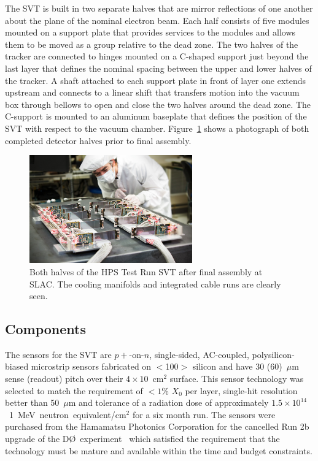 \documentclass[final,3p,times,twocolumn]{elsarticle}
\newcommand{\fluenceunit}{1~MeV~neutron~equivalent/cm\ensuremath{^2}}
\begin{document}
The SVT is built in two separate halves that are mirror reflections of one another about the plane of 
the nominal electron beam.  Each half consists of five modules mounted on a support plate that 
provides services to the modules and allows them to be moved as a group relative to the dead zone. 
The two halves of the tracker are connected to hinges mounted on a C-shaped support just beyond 
the last layer that defines the nominal spacing between the upper and lower halves of the tracker.  A 
shaft attached to each support plate in front of layer one extends upstream and connects to a linear shift 
that transfers motion into the vacuum box through bellows to open and close the two halves around 
the dead zone. The C-support is mounted to an aluminum baseplate that defines the position of the 
SVT with respect to the vacuum chamber. Figure~\ref{fig:tracker_halves} shows a photograph of both 
completed detector halves prior to final assembly. 
\begin{figure}[htp]
\begin{center}
    \includegraphics[width=7cm]{figures/2012-101-PHOTON-DETECTOR-001}
\caption{\small{Both halves of the HPS Test Run SVT after final assembly at SLAC.  The cooling manifolds and 
integrated cable runs are clearly seen.} }
\label{fig:tracker_halves}
\end{center}
\end{figure}

\subsection{Components}
The sensors for the SVT are $p+$-on-$n$, single-sided, AC-coupled, polysilicon-biased microstrip 
sensors fabricated on $<$100$>$ silicon and have 30 (60)~$\mu$m sense (readout) pitch over their 
$4\times10$~cm$^2$ surface. This sensor technology was selected to match the requirement of 
$<1$\% $X_0$ per layer, single-hit resolution better than 50~$\mu$m and tolerance of a radiation 
dose of approximately $1.5\times10^{14}$~\fluenceunit{} for a six month run. The sensors 
were purchased from the Hamamatsu Photonics Corporation for the cancelled 
Run 2b upgrade of the D\O~experiment~\cite{Denisov:2001aa} which satisfied the requirement that 
the technology must be mature and available within the time and budget constraints.
\end{document}

